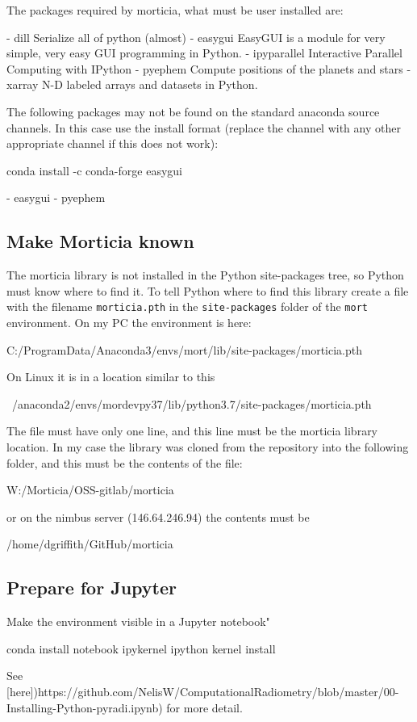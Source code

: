 The packages required by morticia, what must be user installed are:

- dill Serialize all of python (almost)
- easygui EasyGUI is a module for very simple, very easy GUI programming in Python.
- ipyparallel  Interactive Parallel Computing with IPython
- pyephem Compute positions of the planets and stars
- xarray N-D labeled arrays and datasets in Python.

The  following packages may not be found on the standard anaconda source channels.
In this case use the install format (replace the channel with any other appropriate channel if this does not work):  

    conda install -c conda-forge easygui

- easygui
- pyephem


\subsection{Make Morticia known}

The morticia library is not installed in the Python site-packages tree, so Python must know where to find it. To tell Python where to find this library create a file with the filename \lstinline{morticia.pth} in the \lstinline{site-packages} folder of the \lstinline{mort} environment. On my PC the environment is here: 

    C:/ProgramData/Anaconda3/envs/mort/lib/site-packages/morticia.pth

On Linux it is in a location similar to this

    ~/anaconda2/envs/mordevpy37/lib/python3.7/site-packages/morticia.pth

The file must have only one line, and this line must be the morticia library location.    In my case the library was cloned from the repository into the following folder, and this must be the contents of the file:

    W:/Morticia/OSS-gitlab/morticia

or on the nimbus server (146.64.246.94) the contents must be

    /home/dgriffith/GitHub/morticia



\subsection{Prepare for Jupyter}

Make the environment visible in a Jupyter notebook"

    conda install notebook ipykernel
    ipython kernel install

See [here])https://github.com/NelisW/ComputationalRadiometry/blob/master/00-Installing-Python-pyradi.ipynb) for more detail.

